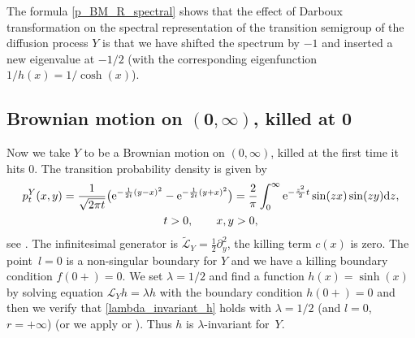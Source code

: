 \documentclass[10pt,a4paper]{amsart}
\numberwithin{equation}{section}
\theoremstyle{definition}
\def\L{{\mathcal L}}
\def\d{{\textnormal d}}
\begin{document}
The formula \eqref{p_BM_R_spectral} shows that the effect of Darboux transformation on the spectral representation of the transition semigroup of the diffusion process $Y$ is that we have shifted the spectrum by $-1$ and inserted a new eigenvalue at $-1/2$ (with the corresponding eigenfunction~${1/h(x)=1/\cosh(x)}$).

\subsection[Brownian motion on (0,infty), killed at 0]{Brownian motion on $\boldsymbol{(0,\infty)}$, killed at $\boldsymbol{0}$}\label{example2}

Now we take $Y$ to be a Brownian motion on $(0,\infty)$, killed at the first time it hits $0$. The transition probability density is given by
\begin{gather*}
p_t^Y(x,y)=\frac{1}{\sqrt{2\pi t}} \bigl({\rm e}^{-\frac{1}{2t}(y-x)^2}-{\rm e}^{-\frac{1}{2t}(y+x)^2}\bigr)= \frac{2}{\pi} \int_0^{\infty} {\rm e}^{-\frac{z^2}{2} t}
\sin(z x) \sin(z y) \d z, \\ t>0, \qquad x,y >0,
\end{gather*}
see \cite[p.~120]{Borodin2002}. The infinitesimal generator is $\widetilde \L_Y=\frac{1}{2}\partial_y^2$, the killing term $c(x)$ is zero. The point~${l=0}$
is a non-singular boundary for $Y$ and we have a killing boundary condition $f(0+)=0$. We set $\lambda=1/2$ and find a function $h(x)=\sinh(x)$ by solving equation $\L_Y h= \lambda h$ with the boundary condition $h(0+)=0$ and then we verify that
\eqref{lambda_invariant_h} holds with $\lambda=1/2$ (and $l=0$, $r=+\infty$) (or we apply \cite[Theorem 2.7]{Rogers_2021} or \cite[Corollary 2.2]{Mijatovic_2012}). Thus $h$ is $\lambda$-invariant for~$Y$.
\end{document}
